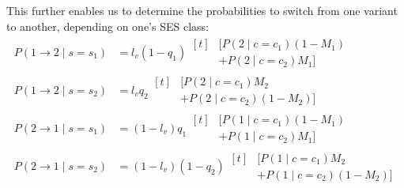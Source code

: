 \documentclass[../thesis.tex]{subfiles}
\begin{document}
This further enables us to determine the probabilities to switch from one variant to
another, depending on one's \ac{SES} class:
\begin{equation}
  \label{eq:final_trans_probs}
  \begin{aligned}
      P(1 \rightarrow 2 \mid s = s_1)
          &= l_v (1 - q_1)
          \begin{aligned}[t]
            &[P(2 \mid c = c_1) (1 - M_1)
            \\
            &+ P(2 \mid c = c_2) M_1]
          \end{aligned}
      \\[5pt]
      P(1 \rightarrow 2 \mid s = s_2)
          &= l_v q_2
          \begin{aligned}[t]
              &[P(2 \mid c = c_1) M_2
              \\
              &+ P(2 \mid c = c_2)(1 - M_2)]
          \end{aligned}
      \\[5pt]
      P(2 \rightarrow 1 \mid s = s_1)
          &= (1 - l_v) q_1
          \begin{aligned}[t]
              &[P(1 \mid c = c_1) (1 - M_1)
              \\
              & + P(1 \mid c = c_2) M_1]
          \end{aligned}
      \\[5pt]
      P(2 \rightarrow 1 \mid s = s_2)
          &= (1 - l_v) (1 - q_2)
          \begin{aligned}[t]
              &[P(1 \mid c = c_1) M_2
              \\
              &+ P(1 \mid c = c_2) (1 - M_2)]
          \end{aligned}
  \end{aligned}
\end{equation}
\end{document}
